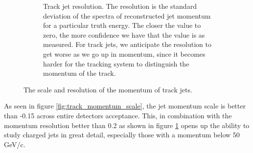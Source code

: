 \begin{figure}[h]
\begin{subfigure}{0.4\textwidth}
        \caption{Track jet resolution.  The resolution is the standard deviation of the spectra of reconstructed jet momentum for a particular truth energy.  The closer the value to zero, the more confidence we have that the value is as measured.  For track jets, we anticipate the resolution to get worse as we go up in momentum, since it becomes harder for the tracking system to distinguish the momentum of the track.}
        \label{fig:track_momentum_resolution}
    \end{subfigure}
    \caption{The scale and resolution of the momentum of track jets.}
    \label{fig:track_momentum_reso_scale}
\end{figure}

As seen in figure \ref{fig:track_momentum_scale}, the jet momentum scale is better than -0.15 across entire detectors acceptance.  This, in combination with the momentum resolution better than 0.2 as shown in figure \ref{fig:track_momentum_resolution} opens up the ability to study charged jets in great detail, especially those with a momentum below 50 GeV/c.  

